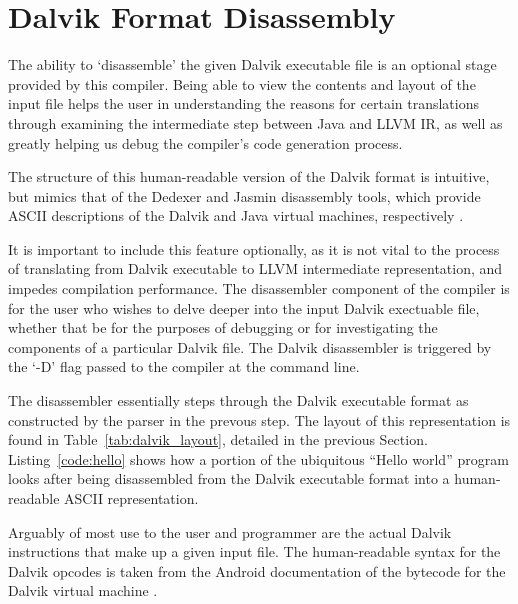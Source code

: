 \section{Dalvik Format Disassembly}
\label{sec:diss}

The ability to `disassemble' the given Dalvik executable file is an optional stage provided by this compiler. Being able to view the contents and layout of the input file helps the user in understanding the reasons for certain translations through examining the intermediate step between Java and LLVM IR, as well as greatly helping us debug the compiler's code generation process.

The structure of this human-readable version of the Dalvik format is intuitive, but mimics that of the Dedexer and Jasmin disassembly tools, which provide ASCII descriptions of the Dalvik and Java virtual machines, respectively \cite{dedexer} \cite{jasmin}. 

It is important to include this feature optionally, as it is not vital to the process of translating from Dalvik executable to LLVM intermediate representation, and impedes compilation performance. The disassembler component of the compiler is for the user who wishes to delve deeper into the input Dalvik exectuable file, whether that be for the purposes of debugging or for investigating the components of a particular Dalvik file. The Dalvik disassembler is triggered by the `-D' flag passed to the compiler at the command line.

The disassembler essentially steps through the Dalvik executable format as constructed by the parser in the prevous step. The layout of this representation is found in Table~\ref{tab:dalvik_layout}, detailed in the previous Section. Listing~\ref{code:hello} shows how a portion of the ubiquitous ``Hello world'' program looks after being disassembled from the Dalvik executable format into a human-readable ASCII representation.

Arguably of most use to the user and programmer are the actual Dalvik instructions that make up a given input file. The human-readable syntax for the Dalvik opcodes is taken from the Android documentation of the bytecode for the Dalvik virtual machine \cite{dvk_bytecode} \cite{dvk_opcodes}.

\newpage

\lstset{
	language=Assembler,
	basicstyle=\small,
	stringstyle=\ttfamily
}

